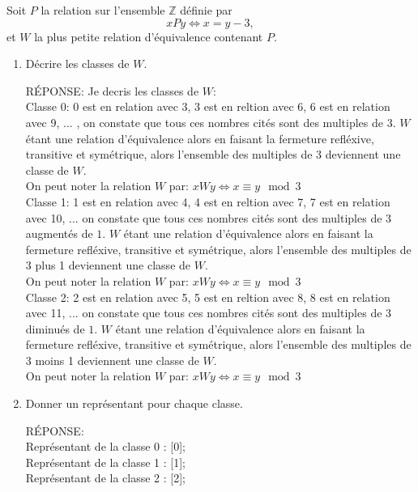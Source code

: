Soit $P$ la relation sur l'ensemble $\mathbb{Z}$ 
d\'efinie par
\[xPy \Longleftrightarrow x= y -  3, \] 
et $W$ la plus petite relation d'équivalence contenant $P$.
\begin{enumerate}[\bf 1.]
\item{} Décrire les classes de $W$.
\begin{framed}

RÉPONSE: Je decris les classes de $W$:\\
Classe 0: 0 est en relation avec 3, 3 est en reltion avec 6, 6 est en relation avec 9, ... , on constate que tous ces nombres cités sont des multiples de $3$. $W$ étant une relation d'équivalence alors en faisant la fermeture refléxive, transitive et symétrique, alors l'ensemble des multiples de 3 deviennent une classe de $W$. \\
On peut noter la relation $W$ par: $xWy \Longleftrightarrow x \equiv y \mod 3$\\
Classe 1: 1 est en relation avec 4, 4 est en reltion avec 7, 7 est en relation avec 10, ... on constate que tous ces nombres cités sont des multiples de $3$ augmentés de $1$. $W$ étant une relation d'équivalence alors en faisant la fermeture refléxive, transitive et symétrique, alors l'ensemble des multiples de 3 plus 1 deviennent une classe de $W$. \\
On peut noter la relation $W$ par: $xWy \Longleftrightarrow x \equiv y \mod 3$ \\
Classe 2:  2 est en relation avec 5, 5 est en reltion avec 8, 8 est en relation avec 11, ... on constate que tous ces nombres cités sont des multiples de $3$ diminués de $1$. $W$ étant une relation d'équivalence alors en faisant la fermeture refléxive, transitive et symétrique, alors l'ensemble des multiples de 3 moins 1 deviennent une classe de $W$. \\
On peut noter la relation $W$ par: $xWy \Longleftrightarrow x \equiv y \mod 3$ \\
\end{framed}
\item{} Donner un représentant pour chaque classe.
\begin{framed}

RÉPONSE:\\
Représentant de la classe 0 : [0]; \\
Représentant de la classe 1 : [1]; \\
Représentant de la classe 2 : [2]; 


\end{framed}
\end{enumerate}
